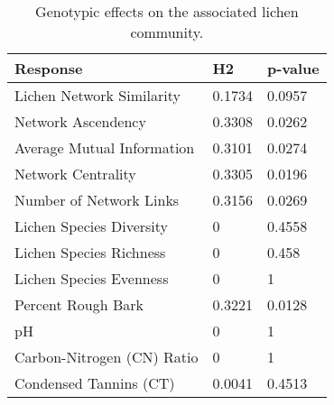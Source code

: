 \begin{table}[ht]
\centering
\begin{tabular}{lll}
  \hline
Response & H2 & p-value \\ 
  \hline
  Lichen Network Similarity & 0.1734 & 0.0957 \\ 
  Network Ascendency & 0.3308 & 0.0262 \\ 
  Average Mutual Information & 0.3101 & 0.0274 \\ 
  Network Centrality & 0.3305 & 0.0196 \\ 
  Number of Network Links & 0.3156 & 0.0269 \\ 
  Lichen Species Diversity & 0 & 0.4558 \\ 
  Lichen Species Richness & 0 & 0.458 \\ 
  Lichen Species Evenness & 0 & 1 \\ 
  Percent Rough Bark & 0.3221 & 0.0128 \\ 
  pH & 0 & 1 \\ 
  Carbon-Nitrogen (CN) Ratio & 0 & 1 \\ 
  Condensed Tannins (CT) & 0.0041 & 0.4513 \\ 
   \hline
\end{tabular}
\caption{Genotypic effects on the associated lichen community.} 
\label{tab:h2_table}
\end{table}
